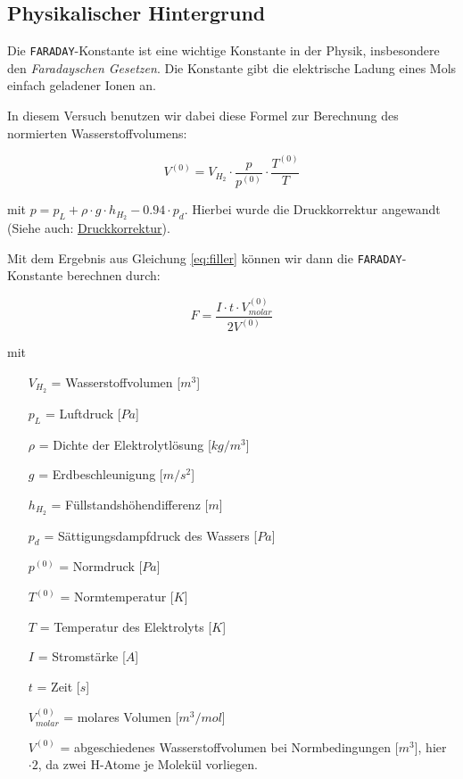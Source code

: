\documentclass[10pt,a4paper]{article}
\begin{document}
\subsection{Physikalischer Hintergrund}
\begin{flushleft}
Die \texttt{FARADAY}-Konstante ist eine wichtige Konstante in der Physik, insbesondere den \textit{Faradayschen Gesetzen}. Die Konstante gibt die elektrische Ladung eines Mols einfach geladener Ionen an.

In diesem Versuch benutzen wir dabei diese Formel zur Berechnung des normierten Wasserstoffvolumens:

\begin{equation}\label{eq:filler}
V^{(0)} = V_{H_2} \cdot \frac{p}{p^{(0)}} \cdot \frac{T^{(0)}}{T}
\end{equation}

mit $p = p_L + \rho \cdot g \cdot h_{H_2} - 0.94 \cdot p_d$. Hierbei wurde die Druckkorrektur angewandt (Siehe auch: \hyperlink{Dkorr}{Druckkorrektur}).

Mit dem Ergebnis aus Gleichung \ref{eq:filler} können wir dann die \texttt{FARADAY}-Konstante berechnen durch:

\begin{equation}\label{eq:main}
F = \frac{I \cdot t \cdot V^{(0)}_{molar}}{2V^{(0)}}
\end{equation}

mit

\begin{itemize}[itemsep=0pt]
\item[$V_{H_2}$] = Wasserstoffvolumen [$m^3$]
\item[$p_L$] = Luftdruck [$Pa$]
\item[$\rho$] = Dichte der Elektrolytlösung [$kg / m^3$]
\item[$g$] = Erdbeschleunigung [$m / s^2$]
\item[$h_{H_2}$] = Füllstandshöhendifferenz [$m$]
\item[$p_d$] = Sättigungsdampfdruck des Wassers [$Pa$]
\item[$p^{(0)}$] = Normdruck [$Pa$]
\item[$T^{(0)}$] = Normtemperatur [$K$]
\item[$T$] = Temperatur des Elektrolyts [$K$]
\item[$I$] = Stromstärke [$A$]
\item[$t$] = Zeit [$s$]
\item[$V^{(0)}_{molar}$] = molares Volumen [$m^3 / mol$]
\item[$V^{(0)}$] = abgeschiedenes Wasserstoffvolumen bei Normbedingungen [$m^3$], hier $\cdot 2$, da zwei H-Atome je Molekül vorliegen.
\end{itemize}


\end{flushleft}
\end{document}
